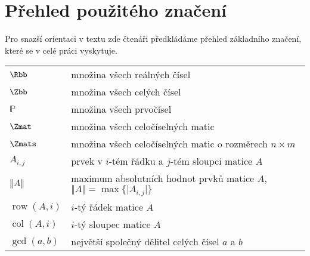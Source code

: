 \chapter*{Přehled použitého značení}

Pro snazší orientaci v textu zde čtenáři předkládáme přehled základního značení, které se v celé práci vyskytuje.
\begin{flushleft}
\begin{longtable}[l]{ll} %
  $\Rbb$                      & množina všech reálných čísel \\[1mm]
  $\Zbb$                      & množina všech celých čísel \\[1mm]
  $\mathbb{P}$                & množina všech prvočísel\\[1mm]
  $\Zmat$                     & množina všech celočíselných matic\\[1mm]
  $\Zmats$                    & množina všech celočíselných matic o rozměrech $ n \times m $\\[1mm]
  $A_{i, j}$			      & prvek v $ i $-tém řádku a $ j $-tém sloupci matice $ A $\\[1mm]
  $\Vert A \Vert$             & maximum absolutních hodnot prvků matice $ A $, $ \Vert A \Vert = \max{\{\vert A_{i, j} \vert \}}$\\[1mm]
  $\operatorname{row}(A, i) $ & $ i $-tý řádek matice $ A $\\[1mm]
  $\operatorname{col}(A, i) $ & $ i $-tý sloupec matice $ A $\\[1mm]
  $\operatorname{gcd}(a, b) $ & největší společný dělitel celých čísel $ a $ a $ b $\\[1mm]

\end{longtable}
\end{flushleft}

\cleardoublepage
